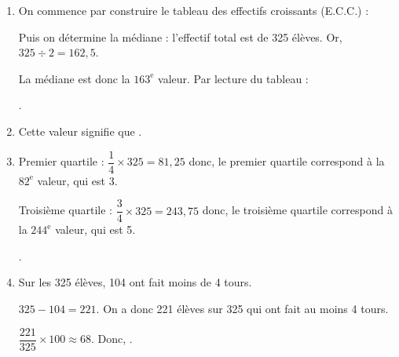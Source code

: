\begin{enumerate}
\begin{enumerate}
             .
          \item On commence par construire le tableau des effectifs croissants (E.C.C.) :
             \begin{center}
             \end{center}
                Puis on détermine la médiane : l'effectif total est de 325 élèves. Or, $325\div2 =162,5$. \par
                La médiane est donc la $163^\text{e}$ valeur. Par lecture du tableau : \par
                .
          \item Cette valeur signifie que .
          \item Premier quartile : $\dfrac14\times325 =81,25$ donc, le premier quartile correspond à la $82^\text{e}$ valeur, qui est 3. \par \smallskip
             Troisième quartile : $\dfrac34\times325 =243,75$ donc, le troisième quartile correspond à la $244^\text{e}$ valeur, qui est 5. \par \smallskip
             .
          \item Sur les 325 élèves, 104 ont fait moins de 4 tours. \par
             $325-104 =221$. On a donc 221 élèves sur 325 qui ont fait au moins 4 tours. \par \smallskip
             $\dfrac{221}{325}\times100\approx 68$. Donc, .
       \end{enumerate}
 \end{enumerate}